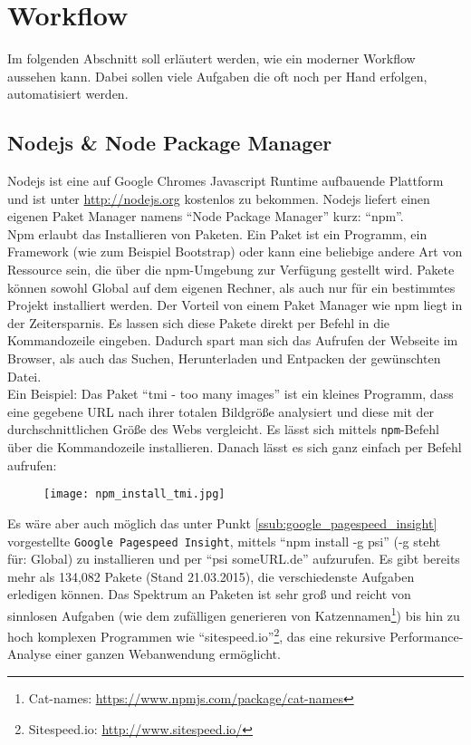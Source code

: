 \section{Workflow} %
\label{sec:workflow}
	Im folgenden Abschnitt soll erläutert werden, wie ein moderner Workflow aussehen kann. Dabei sollen viele Aufgaben die oft noch per Hand erfolgen, automatisiert werden.\\

	\subsection{Nodejs \& Node Package Manager} %
	\label{sub:node_package_manager}
		Nodejs ist eine auf Google Chromes Javascript Runtime aufbauende Plattform und ist unter \url{http://nodejs.org} kostenlos zu bekommen. Nodejs liefert einen eigenen Paket Manager namens "`Node Package Manager"' kurz: "`npm"'.\\

		Npm erlaubt das Installieren von Paketen. Ein Paket ist ein Programm, ein Framework (wie zum Beispiel Bootstrap) oder kann eine beliebige andere Art von Ressource sein, die über die npm-Umgebung zur Verfügung gestellt wird. Pakete können sowohl Global auf dem eigenen Rechner, als auch nur für ein bestimmtes Projekt installiert werden. Der Vorteil von einem Paket Manager wie npm liegt in der Zeitersparnis. Es lassen sich diese Pakete direkt per Befehl in die Kommandozeile eingeben. Dadurch spart man sich das Aufrufen der Webseite im Browser, als auch das Suchen, Herunterladen und Entpacken der gewünschten Datei.\\

		Ein Beispiel: Das Paket "`tmi - too many images"' ist ein kleines Programm, dass eine gegebene URL nach ihrer totalen Bildgröße analysiert und diese mit der durchschnittlichen Größe des Webs vergleicht. Es lässt sich mittels \texttt{npm}-Befehl über die Kommandozeile installieren. Danach lässt es sich ganz einfach per Befehl aufrufen:
		\begin{figure}[htbp]
			\begin{center}
				\texttt{[image: npm\_install\_tmi.jpg]}
				\label{fig:npm_install_tmi}
			\end{center}
		\end{figure}
		

		Es wäre aber auch möglich das unter Punkt \ref{ssub:google_pagespeed_insight} vorgestellte \texttt{Google Pagespeed Insight}, mittels "`npm install -g psi"' (-g steht für: Global) zu installieren und per "`psi someURL.de"' aufzurufen. Es gibt bereits mehr als 134,082 Pakete (Stand 21.03.2015), die verschiedenste Aufgaben erledigen können. Das Spektrum an Paketen ist sehr groß und reicht von sinnlosen Aufgaben (wie dem zufälligen generieren von Katzennamen\footnote{Cat-names: \url{https://www.npmjs.com/package/cat-names}}) bis hin zu hoch komplexen Programmen wie "`sitespeed.io"'\footnote{Sitespeed.io: \url{http://www.sitespeed.io/}}, das eine rekursive Performance-Analyse einer ganzen Webanwendung ermöglicht.\\

